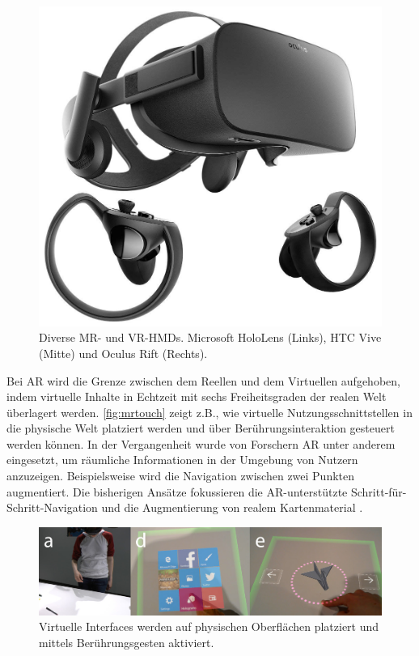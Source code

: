 \begin{figure}[hb]
\begin{minipage}{0.25\textwidth}
        \includegraphics[width=.9\linewidth]{figures/oculus_rift}
    \end{minipage}%
    \caption{Diverse MR- und VR-HMDs. Microsoft HoloLens (Links), HTC Vive (Mitte) und Oculus Rift (Rechts). }
    \label{fig:devices}
\end{figure}

Bei AR wird die Grenze zwischen dem Reellen und dem Virtuellen aufgehoben, indem virtuelle Inhalte in Echtzeit mit sechs Freiheitsgraden der realen Welt überlagert werden.
\autoref{fig:mrtouch} zeigt z.B., wie virtuelle Nutzungsschnittstellen in die physische Welt platziert werden und über Berührungsinteraktion gesteuert werden können.
In der Vergangenheit wurde von Forschern AR unter anderem eingesetzt, um räumliche Informationen in der Umgebung von Nutzern anzuzeigen.
Beispielsweise wird die Navigation zwischen zwei Punkten augmentiert.
Die bisherigen Ansätze fokussieren die AR-unterstützte Schritt-für-Schritt-Navigation \parencites{Hoellerer1999}{Hashish2017}{Mulloni2012} und die Augmentierung von realem Kartenmaterial \parencites{Rohs2009}{Morrison2009}{Reitmayr2005}.
\begin{figure}[ht]
    \centering
    \includegraphics[width=\textwidth]{figures/mrtouch}
    \caption{Virtuelle Interfaces werden auf physischen Oberflächen platziert und mittels Berührungsgesten aktiviert. }
    \label{fig:mrtouch}
\end{figure}


